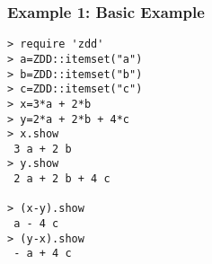 \subsubsection*{Example 1: Basic Example}



\begin{Verbatim}[baselinestretch=0.7,frame=single]
> require 'zdd'
> a=ZDD::itemset("a")
> b=ZDD::itemset("b")
> c=ZDD::itemset("c")
> x=3*a + 2*b
> y=2*a + 2*b + 4*c
> x.show
 3 a + 2 b
> y.show
 2 a + 2 b + 4 c

> (x-y).show
 a - 4 c
> (y-x).show
 - a + 4 c
\end{Verbatim}
